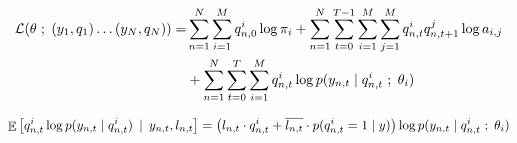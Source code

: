 \documentclass[a4paper, 11pt]{article}
\newcommand{\conde}[2]{\mathop{\mathbb{E}}\left[#1 \hspace{.2em}\mid\hspace{.2em} #2 \right]}
\newcommand{\ssemi}{\hspace{.3em};\hspace{.3em}}
\begin{document}

\begin{displaymath}
  \begin{split}
    \mathcal{L}(\theta \ssemi (y_1, q_1) \dots (y_N, q_N) )
    = &\sum_{n = 1}^N \sum_{i = 1}^{M} q_{n, 0}^i \log{\pi_i}
    + \sum_{n = 1}^N \sum_{t = 0}^{T-1} \sum_{i = 1}^{M} \sum_{j = 1}^{M} q_{n, t}^i q_{n, t+1}^j \log{a_{i,j}} \\
    & + \sum_{n = 1}^N \sum_{t = 0}^{T} \sum_{i = 1}^{M} q_{n, t}^i \log{ p(y_{n, t} \mid q_{n, t}^i \ssemi \theta_i) }
  \end{split}
\end{displaymath}



\begin{displaymath}
  \conde{q_{n, t}^i \log{ p(y_{n, t} \mid q_{n, t}^i)}}{y_{n, t}, l_{n, t}} =
  \left(
    l_{n, t} \cdot q_{n, t}^i + \overline{l_{n, t}} \cdot p(q_{n, t}^i = 1 \mid y)
  \right)
  \log{ p(y_{n, t} \mid q_{n, t}^i \ssemi \theta_i)}
\end{displaymath}
\end{document}
